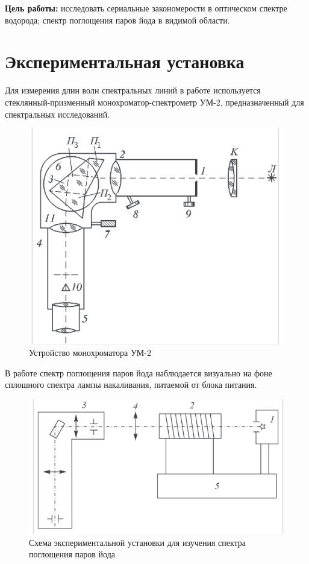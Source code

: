 



	


	\textbf{Цель работы:} исследовать сериальные закономерости в оптическом спектре водорода; спектр поглощения паров йода в видимой области.
	
    
       
        \section{Экспериментальная установка}
        Для измерения длин волн спектральных линий в работе используется стеклянный-призменный монохроматор-спектрометр УМ-2, предназначенный для спектральных исследований.
        

        \begin{figure}[h!]
            \centering
            \includegraphics[width=0.8\linewidth]{pics/scheme1.png}
            \caption{Устройство монохроматора УМ-2}
            \label{scheme1}
        \end{figure} 
        
        В работе спектр поглощения паров йода наблюдается визуально на фоне сплошного спектра лампы накаливания, питаемой от блока питания.
        
        
        \begin{figure}[h!]
            \centering
            \includegraphics[width=0.8\linewidth]{pics/scheme2.png}
            \caption{Схема экспериментальной установки для изучения спектра поглощения паров йода}
            \label{scheme2}
        \end{figure} 
        
